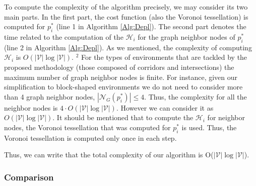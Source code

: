 \documentclass[smallcondensed]{svjour3}
\begin{document}
To compute the complexity of the algorithm precisely, we may consider its two main parts.
In the first part, the cost function (also the Voronoi tessellation) is computed for $p^*_i$ (line 1 in Algorithm \ref{Alg:Depl}). 
The second part denotes the time related to the computation of the $\mathcal{H}_i$ for the graph neighbor nodes of $p^*_i$ (line 2 in Algorithm \ref{Alg:Depl}). As we mentioned, the complexity of computing $\mathcal{H}_i$ is $O(|\mathcal{V}| \log |\mathcal{V}|)$. {\color{blue}$^2$ For the types of environments that are tackled by the proposed methodology (those composed of corridors and intersections) the maximum number of graph neighbor nodes is finite. For instance, given our simplification to block-shaped environments  we do not need to consider more than 4 graph neighbor nodes, $|\mathcal{N}_G(p^*_i)| \leq 4$.} Thus, the complexity for all the neighbor nodes is $4\cdot O(|\mathcal{V}| \log |\mathcal{V}|)$. However we can consider it as $O(|\mathcal{V}| \log |\mathcal{V}|)$.
%
It should be mentioned that to compute the $\mathcal{H}_i$ for neighbor nodes, the Voronoi tessellation that was computed for $p^*_i$ is used. Thus, the Voronoi tessellation is computed only once in each step. 


Thus, we can write that the total complexity of our algorithm is O($|\mathcal{V}| \log |\mathcal{V}|$). 

\subsubsection{Comparison}
\end{document}
